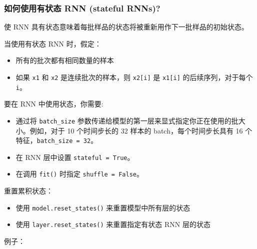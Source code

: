 \subsubsection{如何使用有状态 RNN (stateful
RNNs)?}\label{how-can-i-use-stateful-rnns}

使 RNN 具有状态意味着每批样品的状态将被重新用作下一批样品的初始状态。

当使用有状态 RNN 时，假定：

\begin{itemize}
\tightlist
\item
  所有的批次都有相同数量的样本
\item
  如果 \texttt{x1} 和 \texttt{x2} 是连续批次的样本，则
  \texttt{x2{[}i{]}} 是 \texttt{x1{[}i{]}} 的后续序列，对于每个
  \texttt{i}。
\end{itemize}

要在 RNN 中使用状态，你需要:

\begin{itemize}
\tightlist
\item
  通过将 \texttt{batch\_size}
  参数传递给模型的第一层来显式指定你正在使用的批大小。例如，对于 10
  个时间步长的 32 样本的 batch，每个时间步长具有 16
  个特征，\texttt{batch\_size\ =\ 32}。
\item
  在 RNN 层中设置 \texttt{stateful\ =\ True}。
\item
  在调用 \texttt{fit()} 时指定 \texttt{shuffle\ =\ False}。
\end{itemize}

重置累积状态：

\begin{itemize}
\tightlist
\item
  使用 \texttt{model.reset\_states()} 来重置模型中所有层的状态
\item
  使用 \texttt{layer.reset\_states()} 来重置指定有状态 RNN 层的状态
\end{itemize}

例子：

